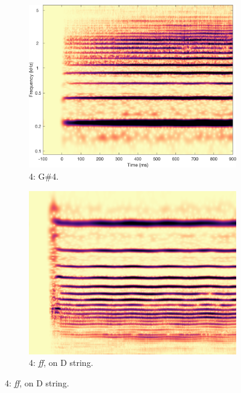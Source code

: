 \begin{figure}
        \begin{subfigure}{0.20\textwidth}
                \centering
                \includegraphics[width=\linewidth]{./figs/demo/Vn-ord-Gsh4-mf-4c.png}
                \caption*{4: G\#4.}
                \label{fig:Vn-ord-Gsh4-mf-4c}
        \end{subfigure}%
        \begin{subfigure}{0.20\textwidth}
                \centering
                \includegraphics[width=\linewidth]{./figs/demo/Vn-ord-G4-ff-3c.png}
                \caption*{4: \emph{ff}, on D string.}
                \label{fig:Vn-ord-G4-ff-3c}
        \end{subfigure}%


\end{figure}
